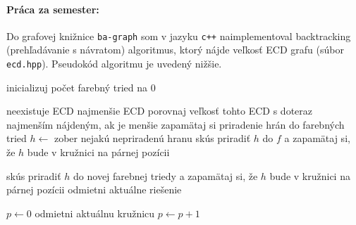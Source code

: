\documentclass[11pt]{article}
\begin{document}
\paragraph{Práca za semester:}
Do grafovej knižnice \texttt{ba-graph} som v jazyku \texttt{c++} naimplementoval backtracking (prehľadávanie 
s návratom) algoritmus, ktorý nájde veľkosť ECD grafu (súbor \texttt{ecd.hpp}). Pseudokód algoritmu je uvedený nižšie.
\begin{algorithmic}[1]
   
        \State inicializuj počet farebný tried na 0
        \State {}

            \State \Return neexistuje ECD
        \Else
            \State \Return najmenšie ECD
        \EndIf
    \EndFunction
    \State
            \State porovnaj veľkosť tohto ECD s doteraz najmenším nájdeným, ak je menšie zapamätaj si priradenie hrán do farebných tried
            \State \Return
        \Else
            \State $h \gets$ zober nejakú nepriradenú hranu \label{line:vyber}
                \State skús priradiť $h$ do $f$ a zapamätaj si, že $h$ bude v kružnici na párnej pozícii
                \State {}
            \EndFor

            \State skús priradiť $h$ do novej farebnej triedy a zapamätaj si, že $h$ bude v kružnici na párnej pozícii
            \State odmietni aktuálne riešenie
            \State \Return
            \EndIf
            \State {}
        \EndIf

    \EndFunction
    \State
        \State $p \gets 0$ 
            \State odmietni aktuálnu kružnicu 
            \State \Return
            \Else
            \State $p \gets p+1$
            \EndIf
        \EndIf
        \EndFor
        

\end{algorithmic}
\end{document}
